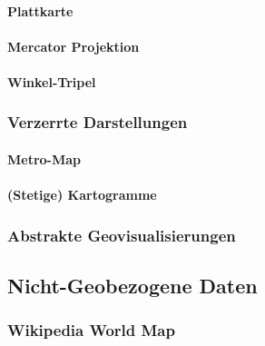                 \paragraph{Plattkarte} %

                \paragraph{Mercator Projektion} %

                \paragraph{Winkel-Tripel} %

            \subsubsection{Verzerrte Darstellungen} %

                \paragraph{Metro-Map} %

                \paragraph{(Stetige) Kartogramme} %

            \subsubsection{Abstrakte Geovisualisierungen} %

        \subsection{Nicht-Geobezogene Daten} %

            \subsubsection{Wikipedia World Map} %

